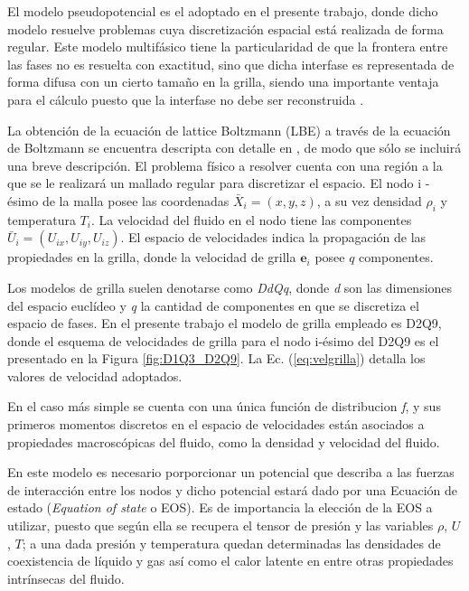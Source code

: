 El modelo pseudopotencial es el adoptado en el presente trabajo, donde dicho modelo resuelve problemas cuya discretización espacial está realizada de forma regular. Este modelo multifásico tiene la particularidad de que la frontera entre las fases no es resuelta con exactitud, sino que dicha interfase es representada de forma difusa con un cierto tamaño en la grilla, siendo una importante ventaja para el cálculo puesto que la interfase no debe ser reconstruida \cite{parrill2019reviews}.


La obtención de la ecuación de lattice Boltzmann (LBE) a través de la ecuación de Boltzmann se encuentra descripta con detalle en \cite{kruger2017lattice}, de modo que sólo se incluirá una breve descripción. El problema físico a resolver cuenta con una región a la que se le realizará un mallado regular para discretizar el espacio. El nodo i - ésimo de la malla posee las coordenadas ${\bar{X}}_{i} = (x,y,z)$, a su vez densidad $\rho_{i}$ y temperatura $T_{i}$. La velocidad del fluido en el nodo tiene las componentes ${\bar{U}}_{i} = ({U}_{ix},{U}_{iy},{U}_{iz})$. El espacio de velocidades indica la propagación de las propiedades en la grilla, donde la velocidad de grilla $\mathbf{e}_{i}$ posee $q$ componentes.

Los modelos de grilla suelen denotarse como \textit{DdQq}, donde \textit{d} son las dimensiones del espacio euclídeo y \textit{q} la cantidad de componentes en que se discretiza el espacio de fases. En el presente trabajo el modelo de grilla empleado es D2Q9, donde el esquema de velocidades de grilla para el nodo i-ésimo del D2Q9 es el presentado en la Figura \ref{fig:D1Q3_D2Q9}. La Ec. (\ref{eq:velgrilla}) detalla los valores de velocidad adoptados. 

En el caso más simple se cuenta con una única función de distribucion \textit{f}, y sus primeros momentos discretos en el espacio de velocidades están asociados a propiedades macroscópicas del fluido, como la densidad y velocidad del fluido.

En este modelo es necesario porporcionar un potencial que describa a las fuerzas de interacción entre los nodos y dicho potencial estará dado por una Ecuación de estado (\textit{Equation of state} o EOS). Es de importancia la elección de la EOS a utilizar, puesto que según ella se recupera el tensor de presión y las variables $\rho$, $U$, $T$; a una dada presión y temperatura quedan determinadas las densidades de coexistencia de líquido y gas así como el calor latente en entre otras propiedades intrínsecas del fluido.

